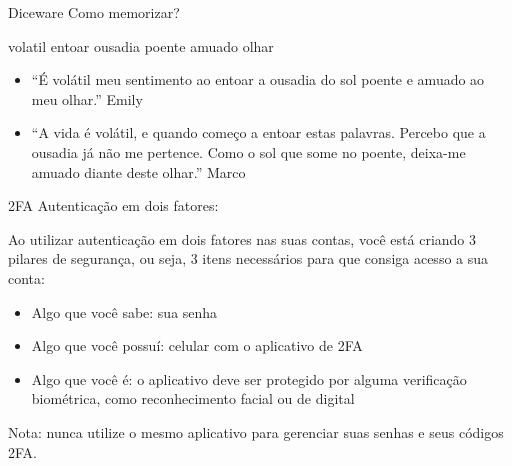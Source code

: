 \begin{frame}{Diceware}
	Como memorizar?

	\begin{center}
		volatil entoar ousadia poente amuado olhar
	\end{center}

	\begin{itemize}
		\item ``É volátil meu sentimento ao entoar a ousadia do sol poente e amuado ao meu olhar.'' Emily
		\item ``A vida é volátil, e quando começo a entoar estas palavras. Percebo que a ousadia já não
		      me pertence. Como o sol que some no poente, deixa-me amuado diante deste olhar.'' Marco
	\end{itemize}
\end{frame}

\begin{frame}{2FA}
	Autenticação em dois fatores:

	Ao utilizar autenticação em dois fatores nas suas contas, você está criando 3 pilares de segurança,
	ou seja, 3 itens necessários para que consiga acesso a sua conta:

	\begin{itemize}
		\item Algo que você sabe: sua senha
		\item Algo que você possuí: celular com o aplicativo de 2FA
		\item Algo que você é: o aplicativo deve ser protegido por alguma verificação biométrica, como
		      reconhecimento facial ou de digital
	\end{itemize}

	\vfill

	Nota: nunca utilize o mesmo aplicativo para gerenciar suas senhas e seus códigos 2FA.
\end{frame}


